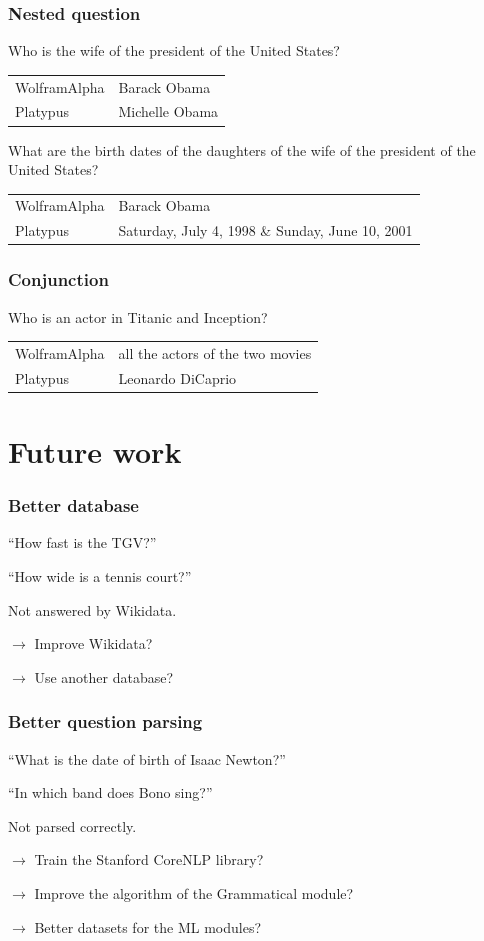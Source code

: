 \begin{frame}[fragile]
    \frametitle{Nested question}

Who is the wife of the president of the United States?
    \begin{tabular}{ll}
        \alert{WolframAlpha} & Barack Obama\\
        \alert{Platypus} & Michelle Obama\\
    \end{tabular}

    \medbreak

    What are the birth dates of the daughters of the wife of the president of the United States?
    \begin{tabular}{ll}
        \alert{WolframAlpha} & Barack Obama\\
        \alert{Platypus} & Saturday, July 4, 1998 \& Sunday, June 10, 2001\\
    \end{tabular}
\end{frame}

\begin{frame}[fragile]
    \frametitle{Conjunction}

Who is an actor in Titanic and Inception?
    \begin{tabular}{ll}
        \alert{WolframAlpha} & all the actors of the two movies\\
        \alert{Platypus} & Leonardo DiCaprio\\
    \end{tabular}
\end{frame}

\section{Future work}

\begin{frame}[fragile]
    \frametitle{Better database}

    ``How fast is the TGV?''

    ``How wide is a tennis court?''

    Not answered by \alert{Wikidata}.

    \medbreak

    $\rightarrow$ Improve Wikidata?

    $\rightarrow$ Use another database?
\end{frame}

\begin{frame}[fragile]
    \frametitle{Better question parsing}

    ``What is the date of birth of Isaac Newton?''

    ``In which band does Bono sing?''

    Not parsed correctly.

    \medbreak

    $\rightarrow$ Train the Stanford CoreNLP library?

    $\rightarrow$ Improve the algorithm of the Grammatical module?

    $\rightarrow$ Better datasets for the ML modules?
\end{frame}


